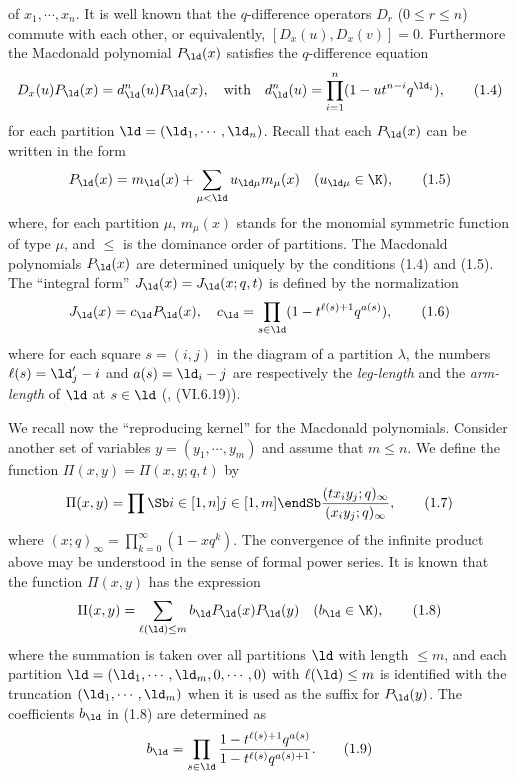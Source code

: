 of $x_1,\cdots,x_n$. 
It is well known that the $q$-difference operators $D_r$ ($0\le r\le n$) 
commute with each other, or equivalently, $[D_x(u), D_x(v)]=0$. 
Furthermore the Macdonald polynomial $P_{\ld}(x)$ satisfies the 
$q$-difference equation
$$
D_x(u) P_{\ld}(x)=d^n_\ld(u) P_{\ld}(x), \quad\text{with}\quad 
d^n_\ld(u)=\prod_{i=1}^n (1-ut^{n-i}q^{\ld_i}), 
\tag{1.4}
$$
for each partition $\ld=(\ld_1,\cdots,\ld_n)$. 
Recall that each $P_\ld(x)$ can be written in the 
form
$$
P_\ld(x)=m_{\ld}(x) + \sum_{\mu<\ld} u_{\ld\mu} m_{\mu}(x)\quad(u_{\ld\mu}
\in \K),
\tag{1.5}
$$
where, for each partition $\mu$, $m_{\mu}(x)$ stands for the monomial 
symmetric function of type $\mu$, and $\le$ is the dominance 
order of partitions. 
The Macdonald polynomials $P_\ld(x)$ are determined uniquely by the conditions 
(1.4) and (1.5). 
The ``integral form'' $J_\ld(x)=J_\ld(x;q,t)$ is defined by the normalization 
$$
J_\ld(x)=c_\ld P_\ld(x) ,\quad c_\ld=\prod_{s\in\ld} 
(1-t^{\ell(s)+1}q^{a(s)}), 
\tag{1.6}
$$
where for each square $s=(i,j)$ in the diagram of a partition $\lambda$,
the numbers $\ell(s)=\ld'_j-i$ and $a(s)=\ld_i-j$ are respectively the
{\it leg-length}  and the {\it arm-length} of $\ld$ at $s\in\ld$
(\cite{Ma}, (VI.6.19)).
\par
We recall now the ``reproducing kernel'' for the Macdonald polynomials. 
Consider another set of variables $y=(y_1,\cdots,y_m)$ and assume that 
$m\le n$.  
We define the function $\Pi(x,y)=\Pi(x,y;q,t)$ by
$$
\Pi(x,y)=\prod\Sb i\in[1,n]\\ j\in[1,m]\endSb
\frac{(tx_iy_j;q)_\infty}{(x_iy_j;q)_\infty}, 
\tag{1.7}
$$
where $(x;q)_\infty=\prod_{k=0}^\infty (1-xq^k)$. 
The convergence of the infinite product above may be 
understood in the sense of formal power series.
It is known that the function $\Pi(x,y)$ has the expression 
$$
\Pi(x,y)=\sum_{\ell(\ld)\le m} b_\ld P_\ld(x) P_\ld(y) \quad(b_\ld\in \K),
\tag{1.8}
$$
where the summation is taken over all partitions $\ld$ with length $\le m$, 
and each partition $\ld=(\ld_1,\cdots,\ld_m,0,\cdots,0)$ with 
$\ell(\ld)\le m$
is identified with the truncation $(\ld_1,\cdots,\ld_m)$ when it is used as 
the suffix for $P_\ld(y)$. 
The coefficients $b_\ld$ in (1.8) are determined as
$$
b_\ld=\prod_{s\in\ld} 
\frac{1-t^{\ell(s)+1}q^{a(s)}}{1-t^{\ell(s)}q^{a(s)+1}}.
\tag{1.9}
$$
\par
